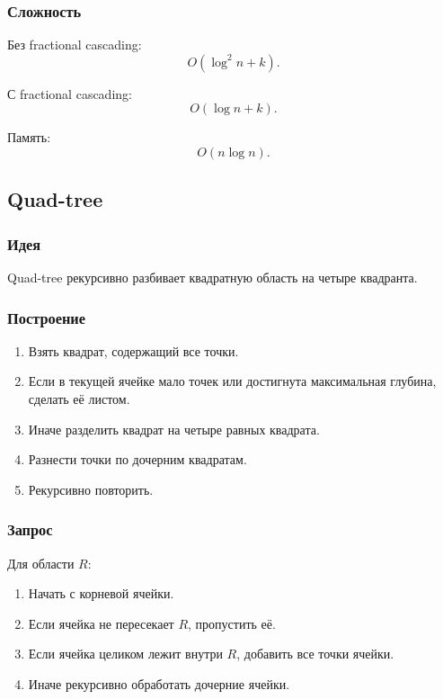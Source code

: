 \documentclass[12pt,a4paper]{article}
\begin{document}
\subsubsection{Сложность}

Без fractional cascading:
\[
O(\log^2 n+k).
\]

С fractional cascading:
\[
O(\log n+k).
\]

Память:
\[
O(n\log n).
\]

\subsection{Quad-tree}

\subsubsection{Идея}

Quad-tree рекурсивно разбивает квадратную область на четыре квадранта.

\subsubsection{Построение}

\begin{enumerate}
    \item Взять квадрат, содержащий все точки.
    \item Если в текущей ячейке мало точек или достигнута максимальная глубина, сделать её листом.
    \item Иначе разделить квадрат на четыре равных квадрата.
    \item Разнести точки по дочерним квадратам.
    \item Рекурсивно повторить.
\end{enumerate}

\subsubsection{Запрос}

Для области \(R\):

\begin{enumerate}
    \item Начать с корневой ячейки.
    \item Если ячейка не пересекает \(R\), пропустить её.
    \item Если ячейка целиком лежит внутри \(R\), добавить все точки ячейки.
    \item Иначе рекурсивно обработать дочерние ячейки.
\end{enumerate}
\end{document}
